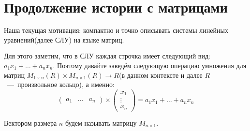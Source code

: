 \section{Продолжение истории с матрицами}
Наша текущая мотивация: компактно и точно описывать системы линейных уравнений(далее СЛУ) на языке матриц.

Для этого заметим, что в СЛУ каждая строчка имеет следующий вид: $a_1x_1 +\dots+ a_nx_n$.
Поэтому давайте заведём следующую операцию умножения для матриц $M_{1\times n}(R) \times M_{n\times 1}(R)\rightarrow R$(в данном контексте и далее $R$~---~произвольное кольцо),
а именно: 
$$
\begin{pmatrix}
    a_1&\dots&a_n
\end{pmatrix} \times
\begin{pmatrix}
    x_1\\\vdots\\x_n
\end{pmatrix}=
a_1x_1 +\dots+ a_nx_n$$

\begin{defn}
    Вектором размера $n$ будем называть матрицу $M_{n\times 1}$.
\end{defn}

